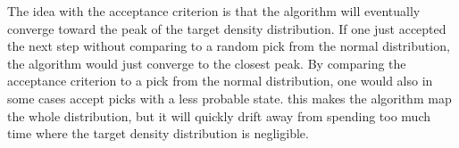 The idea with the acceptance criterion is that the algorithm will eventually
converge toward the peak of the target density distribution. If one just
accepted the next step without comparing to a random pick from the normal
distribution, the algorithm would just converge to the closest peak. By
comparing the acceptance criterion to a pick from the normal distribution, one
would also in some cases accept picks with a less probable state. this makes the
algorithm map the whole distribution, but it will quickly drift away from
spending too much time where the target density distribution is negligible. 
